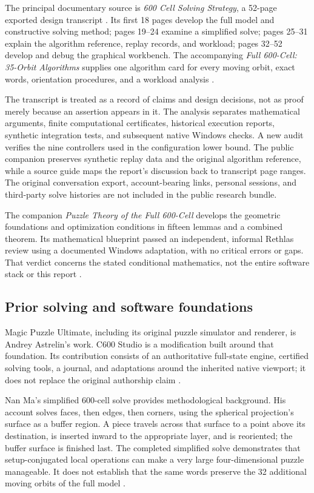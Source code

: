 \documentclass[a4paper,11pt]{article}
\begin{document}
The principal documentary source is \emph{600 Cell Solving Strategy}, a 52-page exported design transcript \cite{transcript}. Its first 18 pages develop the full model and constructive solving method; pages 19--24 examine a simplified solve; pages 25--31 explain the algorithm reference, replay records, and workload; pages 32--52 develop and debug the graphical workbench. The accompanying \emph{Full 600-Cell: 35-Orbit Algorithms} supplies one algorithm card for every moving orbit, exact words, orientation procedures, and a workload analysis \cite{algorithms}.

The transcript is treated as a record of claims and design decisions, not as proof merely because an assertion appears in it. The analysis separates mathematical arguments, finite computational certificates, historical execution reports, synthetic integration tests, and subsequent native Windows checks. A new audit verifies the nine controllers used in the configuration lower bound. The public companion preserves synthetic replay data and the original algorithm reference, while a source guide maps the report's discussion back to transcript page ranges. The original conversation export, account-bearing links, personal sessions, and third-party solve histories are not included in the public research bundle.

The companion \emph{Puzzle Theory of the Full 600-Cell} develops the geometric foundations and optimization conditions in fifteen lemmas and a combined theorem. Its mathematical blueprint passed an independent, informal Rethlas review using a documented Windows adaptation, with no critical errors or gaps. That verdict concerns the stated conditional mathematics, not the entire software stack or this report \cite{puzzletheory}.

\subsection{Prior solving and software foundations}

Magic Puzzle Ultimate, including its original puzzle simulator and renderer, is Andrey Astrelin's work. C600 Studio is a modification built around that foundation. Its contribution consists of an authoritative full-state engine, certified solving tools, a journal, and adaptations around the inherited native viewport; it does not replace the original authorship claim \cite{announcement,validation}.

Nan Ma's simplified 600-cell solve provides methodological background. His account solves faces, then edges, then corners, using the spherical projection's surface as a buffer region. A piece travels across that surface to a point above its destination, is inserted inward to the appropriate layer, and is reoriented; the buffer surface is finished last. The completed simplified solve demonstrates that setup-conjugated local operations can make a very large four-dimensional puzzle manageable. It does not establish that the same words preserve the 32 additional moving orbits of the full model \cite{nanma}.
\end{document}
